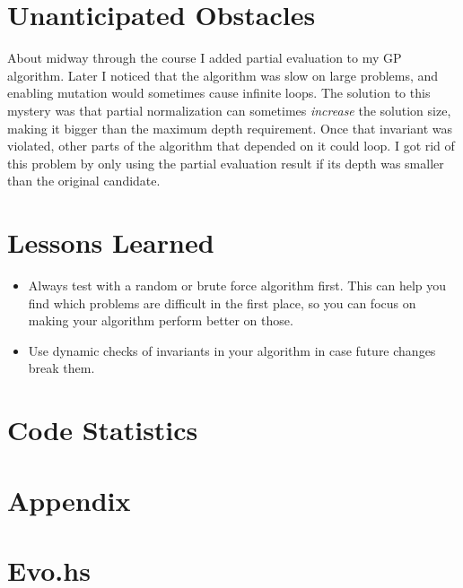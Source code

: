 \documentclass{article}
\begin{document}
\section{Unanticipated Obstacles}

About midway through the course I added partial evaluation to my GP
algorithm. Later I noticed that the algorithm was slow on large
problems, and enabling mutation would sometimes cause infinite
loops. The solution to this mystery was that partial normalization can
sometimes \textit{increase} the solution size, making it bigger than
the maximum depth requirement. Once that invariant was violated, other
parts of the algorithm that depended on it could loop. I got rid of
this problem by only using the partial evaluation result if its depth
was smaller than the original candidate.

\section{Lessons Learned}

\begin{itemize}
\item Always test with a random or brute force algorithm first. This can
help you find which problems are difficult in the first place, so you
can focus on making your algorithm perform better on those.
\item Use dynamic checks of invariants in your algorithm in case future
changes break them.
\end{itemize}

\section{Code Statistics}

\section*{Appendix}
\appendix

\section{Evo.hs}
\end{document}
